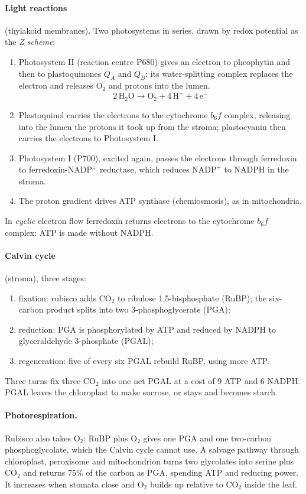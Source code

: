 \paragraph{Light reactions} (thylakoid
membranes). Two photosystems in series,
drawn by redox potential as the
\emph{Z scheme}:
\begin{enumerate}
\item Photosystem II (reaction centre P680)
gives an electron to pheophytin and then to
plastoquinones $Q_A$ and $Q_B$; its
water-splitting complex replaces the
electron and releases $\mathrm{O_2}$ and
protons into the lumen.
$$
\mathrm{2\,H_2O \rightarrow
O_2 + 4\,H^+ + 4\,e^-}
$$
\item Plastoquinol carries the electrons to
the cytochrome $b_6f$ complex, releasing
into the lumen the protons it took up from
the stroma; plastocyanin then carries the
electrons to Photosystem I.
\item Photosystem I (P700), excited again,
passes the electrons through ferredoxin to
ferredoxin-NADP$^+$ reductase, which
reduces $\mathrm{NADP^+}$ to NADPH in the
stroma.
\item The proton gradient drives ATP
synthase (chemiosmosis), as in
mitochondria.
\end{enumerate}
In \emph{cyclic} electron flow ferredoxin
returns electrons to the cytochrome
$b_6f$ complex: ATP is made without NADPH.

\paragraph{Calvin cycle} (stroma), three
stages:
\begin{enumerate}
\item fixation: rubisco adds $\mathrm{CO_2}$
to ribulose 1,5-bisphosphate (RuBP); the
six-carbon product splits into two
3-phosphoglycerate (PGA);
\item reduction: PGA is phosphorylated by
ATP and reduced by NADPH to
glyceraldehyde 3-phosphate (PGAL);
\item regeneration: five of every six PGAL
rebuild RuBP, using more ATP.
\end{enumerate}
Three turns fix three $\mathrm{CO_2}$ into
one net PGAL at a cost of 9 ATP and 6
NADPH. PGAL leaves the chloroplast to make
sucrose, or stays and becomes starch.

\paragraph{Photorespiration.}
Rubisco also takes $\mathrm{O_2}$: RuBP
plus $\mathrm{O_2}$ gives one PGA and one
two-carbon phosphoglycolate, which the
Calvin cycle cannot use. A salvage pathway
through chloroplast, peroxisome and
mitochondrion turns two glycolates into
serine plus $\mathrm{CO_2}$ and returns 75\%
of the carbon as PGA, spending ATP and
reducing power. It increases when stomata
close and $\mathrm{O_2}$ builds up relative
to $\mathrm{CO_2}$ inside the leaf.

